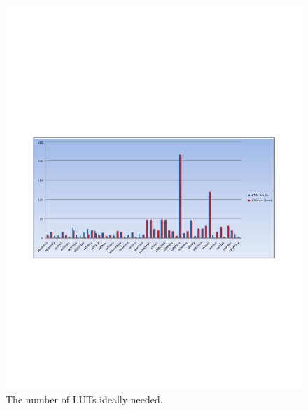 \begin{figure}[ht]
\centering
\includegraphics[scale=1.0, trim=400 280 400 270]{images/output2_ideal.pdf}
\caption{The number of LUTs ideally needed.}
\label{fig:ideal1}
\end{figure}

